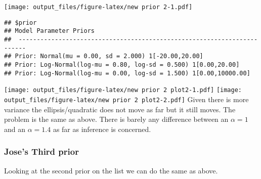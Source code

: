 \documentclass[]{article}
\newenvironment{Shaded}{\begin{snugshade}}{\end{snugshade}}
\newcommand{\DataTypeTok}[1]{\textcolor[rgb]{0.13,0.29,0.53}{#1}}
\newcommand{\DecValTok}[1]{\textcolor[rgb]{0.00,0.00,0.81}{#1}}
\newcommand{\FloatTok}[1]{\textcolor[rgb]{0.00,0.00,0.81}{#1}}
\newcommand{\KeywordTok}[1]{\textcolor[rgb]{0.13,0.29,0.53}{\textbf{#1}}}
\newcommand{\NormalTok}[1]{#1}
\newcommand{\OperatorTok}[1]{\textcolor[rgb]{0.81,0.36,0.00}{\textbf{#1}}}
\newcommand{\StringTok}[1]{\textcolor[rgb]{0.31,0.60,0.02}{#1}}
\begin{document}
\texttt{[image: output\_files/figure-latex/new prior 2-1.pdf]}

\begin{Shaded}
\end{Shaded}

\begin{verbatim}
## $prior
## Model Parameter Priors
##  ------------------------------------------------------------------------
## Prior: Normal(mu = 0.00, sd = 2.000) 1[-20.00,20.00]
## Prior: Log-Normal(log-mu = 0.80, log-sd = 0.500) 1[0.00,20.00]
## Prior: Log-Normal(log-mu = 0.00, log-sd = 1.500) 1[0.00,10000.00]
\end{verbatim}

\texttt{[image: output\_files/figure-latex/new prior 2 plot2-1.pdf]}
\texttt{[image: output\_files/figure-latex/new prior 2 plot2-2.pdf]}
Given there is more variance the ellipsis/quadratic does not move as far
but it still moves. The problem is the same as above. There is barely
any difference between an \(\alpha = 1\) and an \(\alpha = 1.4\) as far
as inference is concerned.

\hypertarget{joses-third-prior}{%
\subsubsection{Jose's Third prior}\label{joses-third-prior}}

Looking at the second prior on the list we can do the same as above.

\begin{Shaded}
\end{Shaded}
\end{document}
